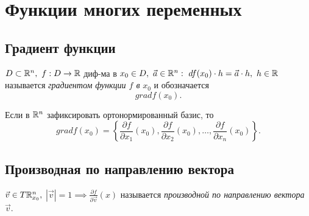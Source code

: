 \section{Функции многих переменных}

\subsection{Градиент функции}

\begin{definition}
    $ D \subset \mathbb{R}^n, \ f:D\rightarrow \mathbb{R} $ диф-ма в $x_0 \in D, \ \vec{a} \in \mathbb{R}^n: \ df(x_0)\cdot h = \vec{a} \cdot h, \ h \in \mathbb{R}$ называется \emph{градиентом функции $f$ в} $x_0$ и обозначается
    \[
        gradf(x_0).
    \]
\end{definition}

\begin{note}
    Если в $\mathbb{R}^n$ зафиксировать ортонормированный базис, то
    \[
        gradf(x_0) = \left\{\frac{\partial f}{\partial x_1}(x_0),\frac{\partial f}{\partial x_2}(x_0),\ldots,\frac{\partial f}{\partial x_n}(x_0)\right\}.
    \]
\end{note}

\subsection{Производная по направлению вектора}

\begin{definition}
    $ \vec{v}\in T\mathbb{R}_{x_0}^n, $ $ |\vec{v}| = 1 \implies \frac{\partial f}{\partial \vec{v}}(x) $ называется \emph{производной по направлению вектора} $ \vec{v} $.
\end{definition}
